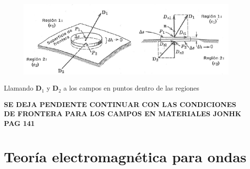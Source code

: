 \begin{figure}[H]
    \centering
    \includegraphics[scale=0.5]{Waves/waves_f5.png}
\end{figure}

Llamando $\mathbf{D}_1$ y $\mathbf{D}_2$ a los campos en puntos dentro de las regiones 










\textbf{SE DEJA PENDIENTE CONTINUAR CON LAS CONDICIONES DE FRONTERA PARA LOS CAMPOS EN MATERIALES JONHK PAG 141}



























































 
\section{Teoría electromagnética para ondas}



